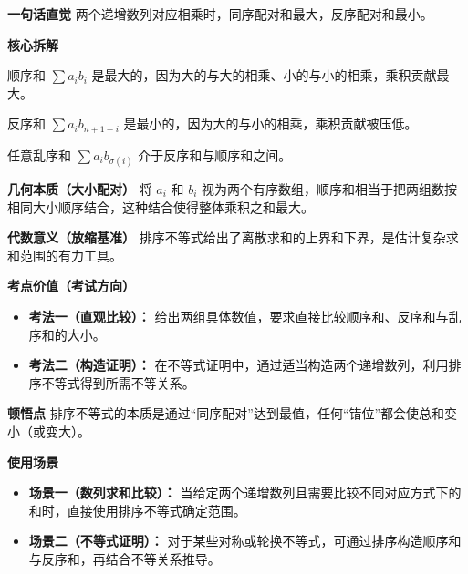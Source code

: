 \begin{explanationbox}
	\textbf{\textcolor{CExplanation}{一句话直觉}}
	两个递增数列对应相乘时，同序配对和最大，反序配对和最小。

	\medskip
	\textbf{\textcolor{CExplanation}{核心拆解}}
	\begin{description}[style=nextline, leftmargin=2.8em, labelsep=0.5em, itemsep=0.45em]
		\item[\textbf{要点一（同序配对）：}]
			顺序和 $\sum a_i b_i$ 是最大的，因为大的与大的相乘、小的与小的相乘，乘积贡献最大。
		\item[\textbf{要点二（反序配对）：}]
			反序和 $\sum a_i b_{n+1-i}$ 是最小的，因为大的与小的相乘，乘积贡献被压低。
		\item[\textbf{要点三（乱序居中）：}]
			任意乱序和 $\sum a_i b_{\sigma(i)}$ 介于反序和与顺序和之间。
	\end{description}

	\medskip
	\textbf{\textcolor{CExplanation}{几何本质（大小配对）}}
	将 $a_i$ 和 $b_i$ 视为两个有序数组，顺序和相当于把两组数按相同大小顺序结合，这种结合使得整体乘积之和最大。

	\medskip
	\textbf{\textcolor{CExplanation}{代数意义（放缩基准）}}
	排序不等式给出了离散求和的上界和下界，是估计复杂求和范围的有力工具。

	\medskip
	\textbf{\textcolor{CExplanation}{考点价值（考试方向）}}
	\begin{itemize}[leftmargin=*, itemsep=0.5em, topsep=0.4em]
		\item \textbf{考法一（直观比较）：} 给出两组具体数值，要求直接比较顺序和、反序和与乱序和的大小。
		\item \textbf{考法二（构造证明）：} 在不等式证明中，通过适当构造两个递增数列，利用排序不等式得到所需不等关系。
	\end{itemize}

	\medskip
	\textbf{\textcolor{CExplanation}{顿悟点}}
	排序不等式的本质是通过“同序配对”达到最值，任何“错位”都会使总和变小（或变大）。

	\medskip
	\textbf{\textcolor{CExplanation}{使用场景}}
	\begin{itemize}[leftmargin=*, itemsep=0.5em, topsep=0.4em]
		\item \textbf{场景一（数列求和比较）：} 当给定两个递增数列且需要比较不同对应方式下的和时，直接使用排序不等式确定范围。
		\item \textbf{场景二（不等式证明）：} 对于某些对称或轮换不等式，可通过排序构造顺序和与反序和，再结合不等关系推导。
	\end{itemize}

\end{explanationbox}
